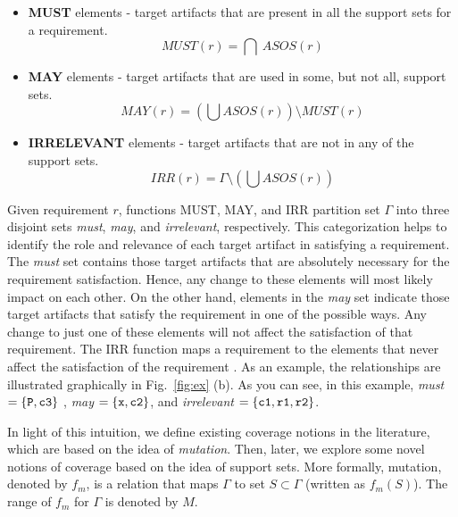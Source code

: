 \begin{itemize}
  \item \textbf{MUST} elements - target artifacts that are present in all the support sets for a requirement.
      $$ MUST (r) = \bigcap \ ASOS(r) $$

  \item \textbf{MAY} elements - target artifacts that are used in some, but not all, support sets.
      $$MAY(r) = (\bigcup ASOS (r)) \setminus MUST (r) $$

  \item \textbf{IRRELEVANT} elements - target artifacts that are not in any of the support sets. $$IRR(r) = \Gamma \setminus (\bigcup ASOS (r))$$
\end{itemize}

Given requirement $r$, functions MUST, MAY, and IRR partition set $\Gamma$ into three disjoint sets \emph{must}, \emph{may}, and \emph{irrelevant}, respectively. This categorization helps to identify the role and relevance of each target artifact in satisfying a requirement. The \emph{must} set contains those target artifacts that are absolutely necessary for the requirement satisfaction. Hence, any change to these elements will most likely impact on each other. On the other hand, elements in the \emph{may} set indicate those target artifacts that satisfy the requirement in one of the possible ways.  Any change to just one of these elements will not affect the satisfaction of that requirement. The IRR function maps a requirement to the elements that never affect the satisfaction of the requirement \cite{Murugesan16:renext}. As an example, the relationships are illustrated graphically in Fig.~\ref{fig:ex} (b). As you can see, in this example,
\emph{must} $= \{ {\tt P}, {\tt c3}\}$ ,
\emph{may} $= \{ {\tt x}, {\tt c2}\}$, and \emph{irrelevant} $= \{ {\tt c1}, {\tt r1}, {\tt r2}\}$.


In light of this intuition, we define existing coverage notions in the literature, which are based on the idea of \emph{mutation}. Then, later, we explore some novel notions of coverage based on the idea of support sets.  More formally, mutation, denoted by $f_m$, is a relation that maps $\Gamma$ to set $S \subset \Gamma$ (written as $f_m (S)$). The range of $f_m$ for $\Gamma$ is denoted by $M$.

